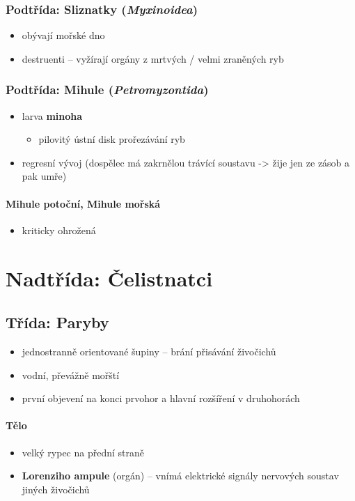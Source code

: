 \subsubsection{Podtřída: Sliznatky (\textit{Myxinoidea})}
\begin{itemize}
\item obývají mořské dno
\item destruenti -- vyžírají orgány z mrtvých / velmi zraněných ryb
\end{itemize}

\subsubsection{Podtřída: Mihule (\textit{Petromyzontida})}
\begin{itemize}
\item larva \textbf{minoha}
	\begin{itemize}
	\item pilovitý ústní disk \ra prořezávání ryb
	\end{itemize}
\item regresní vývoj (dospělec má zakrnělou trávící soustavu -> žije jen ze zásob a pak umře)
\end{itemize}

\paragraph{Mihule potoční, Mihule mořská}
\begin{itemize}
\item kriticky ohrožená
\end{itemize}

\newpage
\section{Nadtřída: Čelistnatci}
\subsection{Třída: Paryby}
\begin{itemize}
\item jednostranně orientované šupiny -- brání přisávání živočichů
\item vodní, převážně mořští
\item první objevení na konci prvohor a hlavní rozšíření v druhohorách
\end{itemize}

\paragraph{Tělo}
\begin{itemize}
\item velký rypec na přední straně
\item \textbf{Lorenziho ampule} (orgán) -- vnímá elektrické signály nervových soustav jiných živočichů
\end{itemize}

